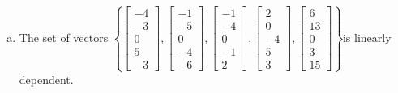 \begin{exerciseAnswer}
\begin{enumerate}[(a)]
\item  The set of vectors \( \left\{ \left[\begin{array}{c}
-4 \\
-3 \\
0 \\
5 \\
-3
\end{array}\right] , \left[\begin{array}{c}
-1 \\
-5 \\
0 \\
-4 \\
-6
\end{array}\right] , \left[\begin{array}{c}
-1 \\
-4 \\
0 \\
-1 \\
2
\end{array}\right] , \left[\begin{array}{c}
2 \\
0 \\
-4 \\
5 \\
3
\end{array}\right] , \left[\begin{array}{c}
6 \\
13 \\
0 \\
3 \\
15
\end{array}\right] \right\} \)is linearly dependent.
\end{enumerate}
    
\end{exerciseAnswer}
    

